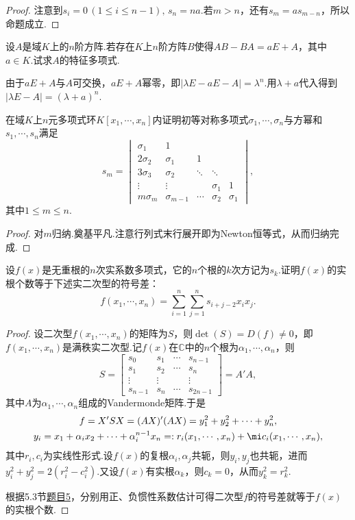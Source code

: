 \begin{proof}
	注意到$s_i=0\,(1\le i\le n-1),\,s_n=na$.若$m>n$，还有$s_m=as_{m-n}$，所以命题成立.
\end{proof}
\begin{prob}[11]
	设$A$是域$K$上的$n$阶方阵.若存在$K$上$n$阶方阵$B$使得$AB-BA=aE+A$，其中$a\in K$.试求$A$的特征多项式.
\end{prob}
\begin{sol}
	由于$aE+A$与$A$可交换，$aE+A$幂零，即$|\lambda E-aE-A|=\lambda^n$.用$\lambda+a$代入得到$|\lambda E-A|=(\lambda+a)^n$.
\end{sol}
\begin{prob}[12]
	在域$K$上$n$元多项式环$K[x_1,\cdots,x_n]$内证明初等对称多项式$\sigma_1,\cdots,\sigma_n$与方幂和$s_1,\cdots,s_n$满足
	\[
		s_m=\begin{vmatrix}
			\sigma_1  & 1            &        &          &          \\
			2\sigma_2 & \sigma_1     & 1      &          &          \\
			3\sigma_3 & \sigma_2     & \ddots & \ddots   &          \\
			\vdots    & \vdots       &        & \sigma_1 & 1        \\
			m\sigma_m & \sigma_{m-1} & \cdots & \sigma_2 & \sigma_1
		\end{vmatrix},
	\]
	其中$1\le m\le n$.
\end{prob}
\begin{proof}
	对$m$归纳.奠基平凡.注意行列式末行展开即为Newton恒等式，从而归纳完成.
\end{proof}
\begin{prob}[13]
	设$f(x)$是无重根的$n$次实系数多项式，它的$n$个根的$k$次方记为$s_k$.证明$f(x)$的实根个数等于下述实二次型的符号差：
	\[
		f(x_1,\cdots,x_n)=\sum_{i=1}^{n}\sum_{j=1}^{n}s_{i+j-2}x_ix_j.
	\]
\end{prob}
\begin{proof}
	设二次型$f(x_1,\cdots,x_n)$的矩阵为$S$，则$\det(S)=D(f)\ne 0$，即$f(x_1,\cdots,x_n)$是满秩实二次型.记$f(x)$在$\mathbb{C}$中的$n$个根为$\alpha_1,\cdots,\alpha_n$，则
	\[
		S=\begin{bmatrix}
			s_0     & s_1    & \cdots & s_{n-1}  \\
			s_1     & s_2    & \cdots & s_n      \\
			\vdots  & \vdots &        & \vdots   \\
			s_{n-1} & s_n    & \cdots & s_{2n-1}
		\end{bmatrix}=A'A,
	\]
	其中$A$为$\alpha_1,\cdots,\alpha_n$组成的Vandermonde矩阵.于是
	\begin{gather*}
		f=X'SX=(AX)'(AX)=y_1^2+y_2^2+\cdots+y_n^2,\\
		y_i=x_1+\alpha_ix_2+\cdots+\alpha_i^{n-1}x_n=:r_i(x_1,\cdots,x_n)+\mi c_i(x_1,\cdots,x_n),
	\end{gather*}
	其中$r_i,c_i$为实线性形式.设$f(x)$的复根$\alpha_i,\alpha_j$共轭，则$y_i,y_j$也共轭，进而$y_i^2+y_j^2=2(r_i^2-c_i^2)$.又设$f(x)$有实根$\alpha_k$，则$c_k=0$，从而$y_k^2=r_k^2$.

	根据5.3节\hyperlink{QuadraticFormOfDegreeOneLinearForm}{题目5}，分别用正、负惯性系数估计可得二次型$f$的符号差就等于$f(x)$的实根个数.
\end{proof}

